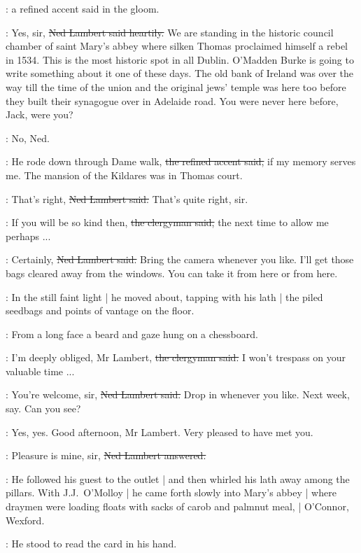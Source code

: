 :
a refined accent said in the gloom.

\lambert:
Yes, sir,
\sout{Ned Lambert said heartily.}
We are standing in the historic council chamber of saint Mary's abbey
where silken Thomas proclaimed himself a rebel in 1534.
This is the most historic spot in all Dublin.
O'Madden Burke is going to write something about it
one of these days.
The old bank of Ireland was over the way
till the time of the union
and the original jews' temple was here too
before they built their synagogue over in Adelaide road.
You were never here before, Jack,
were you?

\jjom:
No, Ned.

\revlove:
He rode down through Dame walk,
\sout{the refined accent said,}
if my memory serves me.
The mansion of the Kildares was in Thomas court.

\lambert:
That's right,
\sout{Ned Lambert said.}
That's quite right, sir.

\revlove:
If you will be so kind then,
\sout{the clergyman said,}
the next time to allow
me perhaps ...

\lambert:
Certainly,
\sout{Ned Lambert said.}
Bring the camera whenever you like.
I'll get those bags cleared away from the windows.
You can take it from here or from here.

:
In the still faint light |
he moved about,
tapping with his lath |
the piled seedbags and points of vantage on the floor.

\begin{mdframed}
    :
    From a long face
    a beard and gaze hung on a chessboard.
\end{mdframed}

\revlove:
I'm deeply obliged, Mr Lambert,
\sout{the clergyman said.}
I won't trespass on your valuable time ...

\lambert:
You're welcome, sir,
\sout{Ned Lambert said.}
Drop in whenever you like.
Next week, say.
Can you see?

\revlove:
Yes, yes.
Good afternoon, Mr Lambert.
Very pleased to have met you.

\lambert:
Pleasure is mine, sir,
\sout{Ned Lambert answered.}

:
He followed his guest to the outlet |
and then whirled his lath away among the pillars.
With J.J.~O'Molloy |
he came forth slowly into Mary's abbey |
where draymen were loading floats
with sacks of carob and palmnut meal, |
O'Connor, Wexford.

:
He stood to read the card in his hand.

